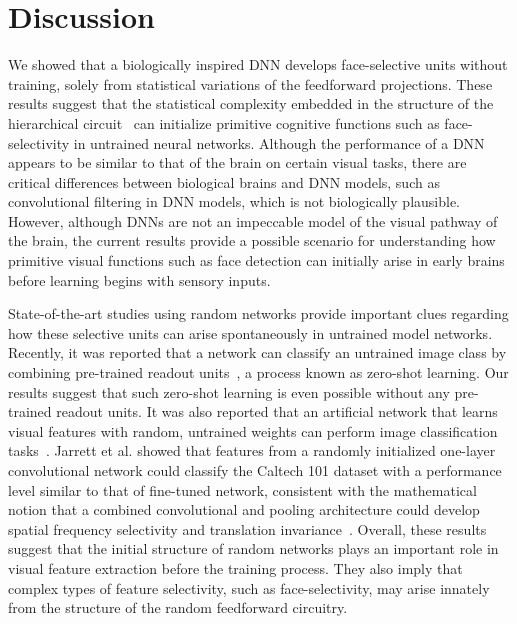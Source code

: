 \documentclass[final,3p,times,twocolumn]{elsarticle}
\begin{document}
\section{Discussion}
We showed that a biologically inspired DNN develops face-selective units without training, solely from statistical variations of the feedforward projections.
These results suggest that the statistical complexity embedded in the structure of the hierarchical circuit~\cite{paik2011retinal,jang2017interlayer,sailamul2017synaptic} can initialize primitive cognitive functions such as face-selectivity in untrained neural networks.
Although the performance of a DNN appears to be similar to that of the brain on certain visual tasks, 
there are critical differences between biological brains and DNN models, such as convolutional filtering in DNN models, which is not biologically plausible.
However, although DNNs are not an impeccable model of the visual pathway of the brain, 
the current results provide a possible scenario for understanding how primitive visual functions such as face detection can initially arise in early brains before learning begins with sensory inputs.


State-of-the-art studies using random networks provide important clues regarding how these selective units can arise spontaneously in untrained model networks.
Recently, it was reported that a network can classify an untrained image class by combining pre-trained readout units~\cite{socher2013zero}, a process known as zero-shot learning.
Our results suggest that such zero-shot learning is even possible without any pre-trained readout units.
It was also reported that an artificial network that learns visual features with random, untrained weights can perform image classification tasks~\cite{jarrett2009best,pinto2009high}.
Jarrett et al. showed that features from a randomly initialized one-layer convolutional network could classify the Caltech 101 dataset with a performance level similar to that of fine-tuned network, 
consistent with the mathematical notion that a combined convolutional and pooling architecture could develop spatial frequency selectivity and translation invariance~\cite{saxe2011random}.
Overall, these results suggest that the initial structure of random networks plays an important role in visual feature extraction before the training process.
They also imply that complex types of feature selectivity, such as face-selectivity, may arise innately from the structure of the random feedforward circuitry.
\end{document}
